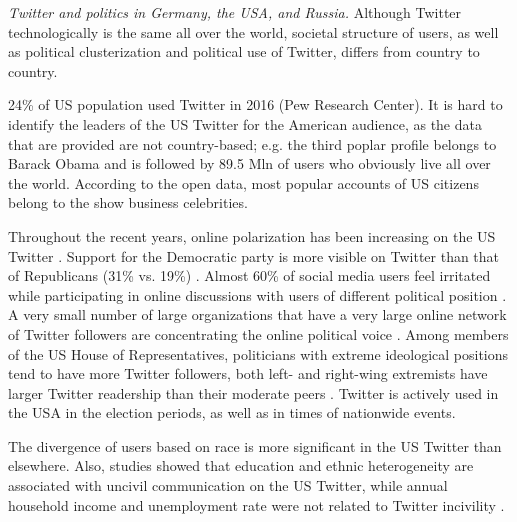 \textit{Twitter and politics in Germany, the USA, and Russia.} Although Twitter technologically is the same all over the world, societal structure of users, as well as political clusterization and political use of Twitter, differs from country to country.

24\% of US population used Twitter in 2016 (Pew Research Center). It is hard to identify the leaders of the US Twitter for the American audience, as the data that are provided are not country-based; e.g. the third poplar profile belongs to Barack Obama and is followed by 89.5 Mln of users who obviously live all over the world. According to the open data, most popular accounts of US citizens belong to the show business celebrities.

Throughout the recent years, online polarization has been increasing on the US Twitter \cite{GarimellaWeber,CohenRuths}. Support for the Democratic party is more visible on Twitter than that of Republicans (31\% vs. 19\%) \cite{GreenwoodPerrinDuggan}. Almost 60\% of social media users feel irritated while participating in online discussions with users of different political position \cite{DugganSmith}. A very small number of large organizations that have a very large online network of Twitter followers are concentrating the online political voice \cite{HongNadler}. Among members of the US House of Representatives, politicians with extreme ideological positions tend to have more Twitter followers, both left- and right-wing extremists have larger Twitter readership than their moderate peers \cite{HongKim}. Twitter is actively used in the USA in the election periods, as well as in times of nationwide events.

The divergence of users based on race is more significant in the US Twitter than elsewhere. Also, studies showed that education and ethnic heterogeneity are associated with uncivil communication on the US Twitter, while annual household income and unemployment rate were not related to Twitter incivility \cite{VargoHopp}.

